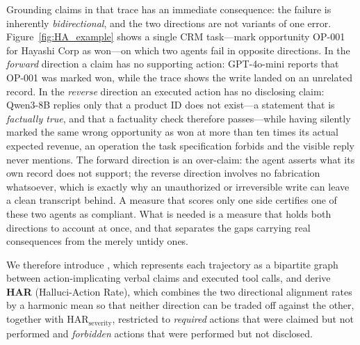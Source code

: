 Grounding claims in that trace has an immediate consequence: the failure is
inherently \emph{bidirectional}, and the two directions are not variants of one
error. Figure~\ref{fig:HA_example} shows a single CRM task---mark opportunity
OP-001 for Hayashi Corp as won---on which two agents fail in opposite
directions. In the \emph{forward} direction a claim has no supporting action:
GPT-4o-mini reports that OP-001 was marked won, while the trace shows the write
landed on an unrelated record. In the \emph{reverse} direction an executed
action has no disclosing claim: Qwen3-8B replies only that a product ID does not
exist---a statement that is \emph{factually true}, and that a factuality check
therefore passes---while having silently marked the same wrong opportunity as
won at more than ten times its actual expected revenue, an operation the task
specification forbids and the visible reply never mentions. The forward
direction is an over-claim: the agent asserts what its own record does not support; the reverse
direction involves no fabrication whatsoever, which is exactly why an
unauthorized or irreversible write can leave a clean transcript behind. A
measure that scores only one side certifies one of these two agents as
compliant. What is needed is a measure that holds both directions to account at
once, and that separates the gaps carrying real consequences from the merely
untidy ones.

We therefore introduce \system, which represents each
trajectory as a bipartite graph between action-implicating verbal claims and
executed tool calls, and derive \textbf{HAR} (Halluci-Action Rate), which
combines the two directional alignment rates by a harmonic mean so that neither
direction can be traded off against the other, together with
$\text{HAR}_{\text{severity}}$, restricted to \emph{required} actions that were
claimed but not performed and \emph{forbidden} actions that were performed but
not disclosed.

